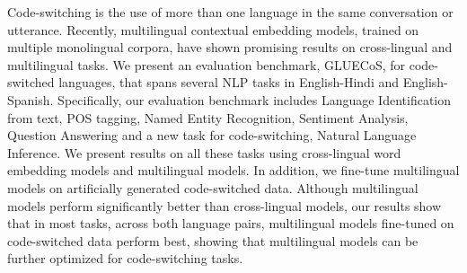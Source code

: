 Code-switching is the use of more than one language in the same conversation or utterance. Recently, multilingual contextual embedding models, trained on multiple monolingual corpora, have shown promising results on cross-lingual and multilingual tasks. We present an evaluation benchmark, GLUECoS, for code-switched languages, that spans several NLP tasks in English-Hindi and English-Spanish. Specifically, our evaluation benchmark includes Language Identification from text, POS tagging, Named Entity Recognition, Sentiment Analysis, Question Answering and a new task for code-switching, Natural Language Inference. We present results on all these tasks using cross-lingual word embedding models and multilingual models. In addition, we fine-tune multilingual models on artificially generated code-switched data. Although multilingual models perform significantly better than cross-lingual models, our results show that in most tasks, across both language pairs, multilingual models fine-tuned on code-switched data perform best, showing that multilingual models can be further optimized for code-switching tasks.
